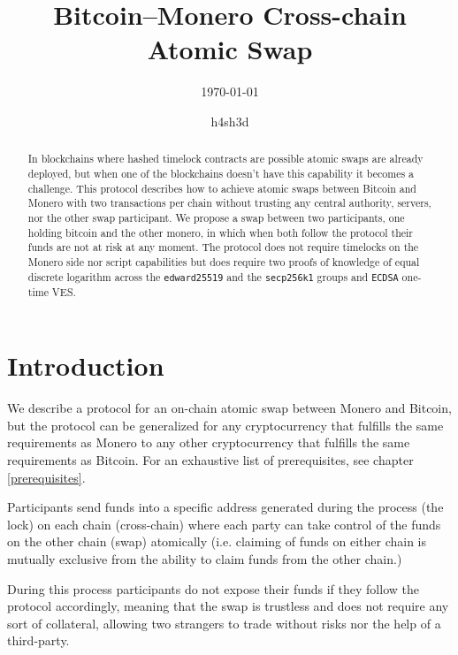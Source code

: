 \documentclass{llncs}
\begin{document}
\title{Bitcoin--Monero Cross-chain Atomic Swap}
\author{h4sh3d}

\subtitle{{\normalsize\today}}

\maketitle

\begin{abstract}
    In blockchains where hashed timelock contracts are possible atomic swaps are already deployed, but when one of the blockchains doesn't have this capability it becomes a challenge. This protocol describes how to achieve atomic swaps between Bitcoin and Monero with two transactions per chain without trusting any central authority, servers, nor the other swap participant.
    We propose a swap between two participants, one holding bitcoin and the other monero, in which when both follow the protocol their funds are not at risk at any moment. The protocol does not require timelocks on the Monero side nor script capabilities but does require two proofs of knowledge of equal discrete logarithm across  the \texttt{edward25519} and the \texttt{secp256k1} groups and \texttt{ECDSA} one-time VES.
\end{abstract}

\section{Introduction}
We describe a protocol for an on-chain atomic swap between Monero and Bitcoin, but the protocol can be generalized for any cryptocurrency that fulfills the same requirements as Monero to any other cryptocurrency that fulfills the same requirements as Bitcoin. For an exhaustive list of prerequisites, see chapter \ref{prerequisites}.

Participants send funds into a specific address generated during the process (the lock) on each chain (cross-chain) where each party can take control of the funds on the other chain (swap) atomically (i.e. claiming of funds on either chain is mutually exclusive from the ability to claim funds from the other chain.)

During this process participants do not expose their funds if they follow the protocol accordingly, meaning that the swap is trustless and does not require any sort of collateral, allowing two strangers to trade without risks nor the help of a third-party.
\end{document}
